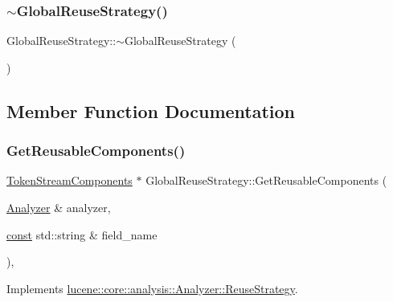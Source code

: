 \subsubsection{\texorpdfstring{$\sim$\+Global\+Reuse\+Strategy()}{~GlobalReuseStrategy()}}
{\footnotesize\ttfamily Global\+Reuse\+Strategy\+::$\sim$\+Global\+Reuse\+Strategy (\begin{DoxyParamCaption}{ }\end{DoxyParamCaption})\hspace{0.3cm}{\ttfamily [virtual]}}



\subsection{Member Function Documentation}
\mbox{\label{classlucene_1_1core_1_1analysis_1_1GlobalReuseStrategy_a79b31d1f8bf9bec685377f6dbff3c5ba}} 
\subsubsection{\texorpdfstring{Get\+Reusable\+Components()}{GetReusableComponents()}}
{\footnotesize\ttfamily \mbox{\hyperlink{classlucene_1_1core_1_1analysis_1_1TokenStreamComponents}{Token\+Stream\+Components}} $\ast$ Global\+Reuse\+Strategy\+::\+Get\+Reusable\+Components (\begin{DoxyParamCaption}\item[{\mbox{\hyperlink{classlucene_1_1core_1_1analysis_1_1Analyzer}{Analyzer}} \&}]{analyzer,  }\item[{\mbox{\hyperlink{ZlibCrc32_8h_a2c212835823e3c54a8ab6d95c652660e}{const}} std\+::string \&}]{field\+\_\+name }\end{DoxyParamCaption})\hspace{0.3cm}{\ttfamily [override]}, {\ttfamily [virtual]}}



Implements \mbox{\hyperlink{classlucene_1_1core_1_1analysis_1_1Analyzer_1_1ReuseStrategy_ab180767950f392037e8ddf78c2f11f95}{lucene\+::core\+::analysis\+::\+Analyzer\+::\+Reuse\+Strategy}}.

